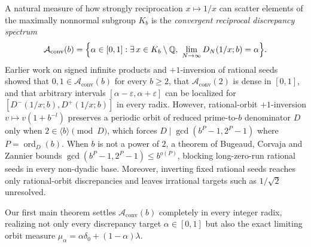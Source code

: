 \documentclass[11pt]{article}
\newcommand{\Aconv}{\mathcal{A}_{\mathrm{conv}}}
\DeclareMathOperator{\ord}{ord}
\begin{document}
A natural measure of how strongly reciprocation $x\mapsto1/x$ can scatter elements of the maximally nonnormal subgroup $K_b$ is the \emph{convergent reciprocal discrepancy spectrum}
\[
\Aconv(b)=\Bigl\{\alpha\in[0,1]:\exists\,x\in K_b\setminus\Q,\ \lim_{N\to\infty}D_N(1/x;b)=\alpha\Bigr\}.
\]
Earlier work on signed infinite products and $+1$-inversion of rational seeds \cite{PaperXIII} showed that $0,1\in\Aconv(b)$ for every $b\ge2$, that $\Aconv(2)$ is dense in $[0,1]$, and that arbitrary intervals $[\alpha-\varepsilon,\alpha+\varepsilon]$ can be localized for $[D^-(1/x;b),D^+(1/x;b)]$ in every radix. However, rational-orbit $+1$-inversion $v\mapsto v(1+b^{-l})$ preserves a periodic orbit of reduced prime-to-$b$ denominator $D$ only when $2\in\langle b\rangle\pmod D$, which forces $D\mid\gcd(b^P-1,2^P-1)$ where $P=\ord_D(b)$. When $b$ is not a power of $2$, a theorem of Bugeaud, Corvaja and Zannier \cite{BCZ03} bounds $\gcd(b^P-1,2^P-1)\le b^{o(P)}$, blocking long-zero-run rational seeds in every non-dyadic base. Moreover, inverting fixed rational seeds reaches only rational-orbit discrepancies and leaves irrational targets such as $1/\sqrt2$ unresolved.

Our first main theorem settles $\Aconv(b)$ completely in every integer radix, realizing not only every discrepancy target $\alpha\in[0,1]$ but also the exact limiting orbit measure $\mu_\alpha=\alpha\delta_0+(1-\alpha)\lambda$.
\end{document}

